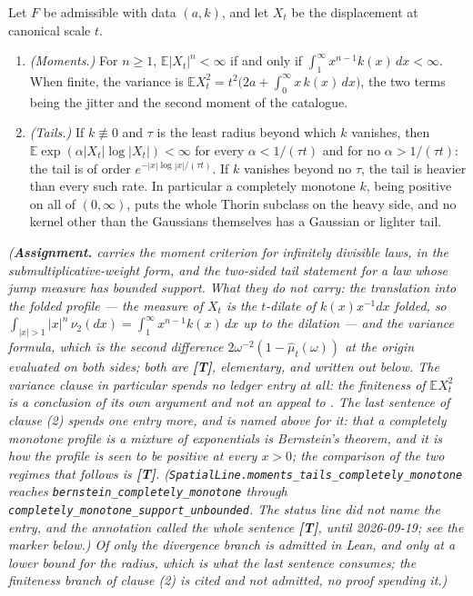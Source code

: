 \begin{proposition}\label{prop:moments-tails}
\notready
Let $F$ be admissible with data $(a,k)$, and let $X_t$ be the displacement at canonical scale
$t$.
\begin{enumerate}
\item \emph{(Moments.)} For $n \ge 1$, $\mathbb{E}|X_t|^n < \infty$ if and only if
$\int_1^\infty x^{n-1}k(x)\,dx < \infty$. When finite, the variance is
$\mathbb{E}X_t^2 = t^2\bigl(2a + \int_0^\infty x\,k(x)\,dx\bigr)$, the two terms being the
jitter and the second moment of the catalogue.
\item \emph{(Tails.)} If $k \not\equiv 0$ and $\tau$ is the least radius beyond which $k$
vanishes, then $\mathbb{E}\exp(\alpha|X_t|\log|X_t|) < \infty$ for every $\alpha < 1/(\tau t)$
and for no $\alpha > 1/(\tau t)$: the tail is of order $e^{-|x|\log|x|/(\tau t)}$. If $k$
vanishes beyond no $\tau$, the tail is heavier than every such rate. In particular a completely monotone $k$,
being positive on all of $(0,\infty)$, puts the whole Thorin subclass on the heavy side, and no
kernel other than the Gaussians themselves has a Gaussian or lighter tail.
\end{enumerate}
\statusA\quad{}\quad{}\quad{}\quad\emph{(\textbf{Assignment.} 
carries the moment criterion for infinitely divisible laws, in the submultiplicative-weight
form, and  the two-sided tail statement for a \Levy{} law whose jump measure has
bounded support. What they do not carry: the translation into the folded profile --- the \Levy{}
measure of $X_t$ is the $t$-dilate of $k(x)x^{-1}dx$ folded, so
$\int_{|x|>1}|x|^n\,\nu_2(dx) = \int_1^\infty x^{n-1}k(x)\,dx$ up to the dilation --- and the
variance formula, which is the second difference $2\omega^{-2}(1 - \hat\mu_t(\omega))$ at the
origin evaluated on both sides; both are \textbf{[T]}, elementary, and written out below. The
variance clause in particular spends no ledger entry at all: the finiteness of
$\mathbb{E}X_t^2$ is a conclusion of its own argument and not an appeal to . The last
sentence of clause (2) spends one entry more, and  is named above for it: that a
completely monotone profile is a mixture of exponentials is Bernstein's theorem, and it is how the
profile is seen to be positive at every $x > 0$; the comparison of the two regimes that follows is
\textbf{[T]}. (\texttt{SpatialLine.moments\_tails\_completely\_monotone} reaches
\texttt{bernstein\_completely\_monotone} through
\texttt{completely\_monotone\_support\_unbounded}. The status line did not name the entry, and the
annotation called the whole sentence \textbf{[T]}, until 2026-09-19; see the marker below.)
Of  only the divergence branch is admitted in Lean,
and only at a lower bound for the radius, which is what the last sentence consumes; the
finiteness branch of clause (2) is cited and not admitted, no proof spending it.)}
\end{proposition}
